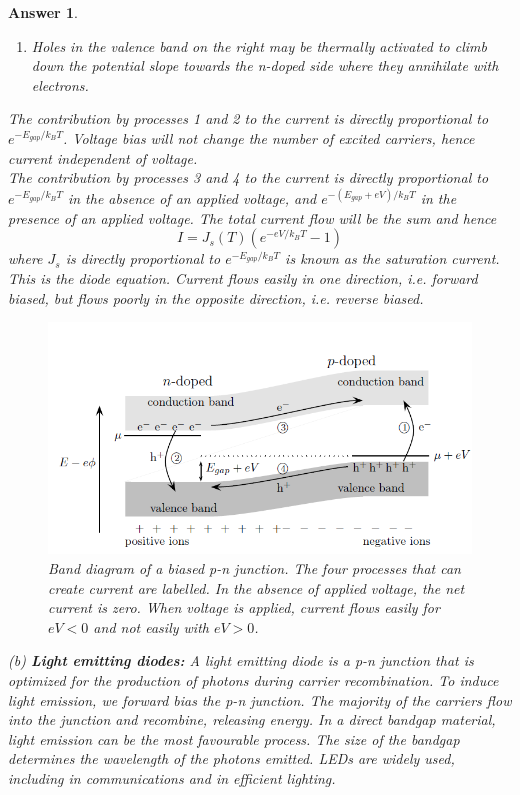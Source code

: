 \documentclass[a4paper]{article}
\newtheorem{ans}{Answer}[subsection]
\theoremstyle{new}
\begin{document}
\begin{ans}
\begin{enumerate}
    \item Holes in the valence band on the right may be thermally activated to climb down the potential slope towards the n-doped side where they annihilate with electrons.
\end{enumerate}
The contribution by processes 1 and 2 to the current is directly proportional to $e^{-E_{gap}/k_BT}$. Voltage bias will not change the number of excited carriers, hence current independent of voltage.\\[5pt]
The contribution by processes 3 and 4 to the current is directly proportional to $e^{-E_{gap}/k_BT}$ in the absence of an applied voltage, and $e^{-(E_{gap}+eV)/k_BT}$ in the presence of an applied voltage. The total current flow will be the sum and hence
$$I=J_s(T)(e^{-eV/k_BT}-1)$$
where $J_s$ is directly proportional to $e^{-E_{gap}/k_BT}$ is known as the saturation current. This is the diode equation. Current flows easily in one direction, i.e. forward biased, but flows poorly in the opposite direction, i.e. reverse biased.
\begin{figure}[H]
    \centering
    \includegraphics[width=\linewidth]{biasedPN.PNG}
    \caption{Band diagram of a biased p-n junction. The four processes that can create current are labelled. In the absence of applied voltage, the net current is zero. When voltage is applied, current flows easily for $eV<0$ and not easily with $eV>0$.~\cite{simon2013oxford} }
\end{figure}
(b) \textbf{Light emitting diodes:} A light emitting diode is a p-n junction that is optimized for the production of photons during carrier recombination. To induce light emission, we forward bias the p-n junction. The majority of the carriers flow into the junction and recombine, releasing energy. In a direct bandgap material, light emission can be the most favourable process. The size of the bandgap determines the wavelength of the photons emitted. LEDs are widely used, including in communications and in efficient lighting.\\[5pt]

\end{ans}
\end{document}
